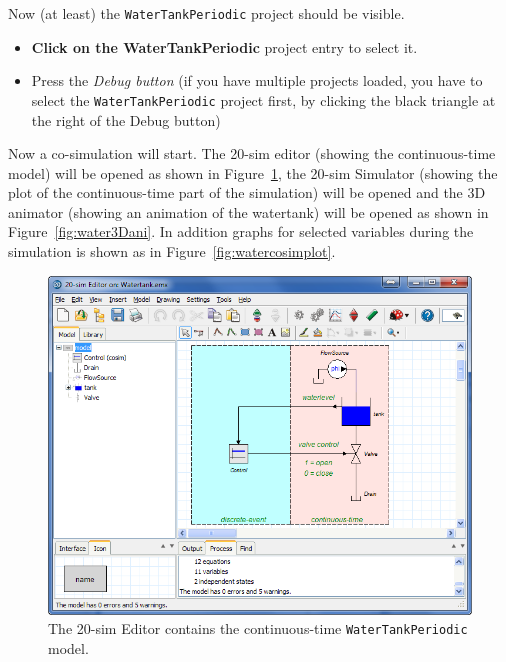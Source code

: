 \documentclass{crescendorepchap}
\begin{document}
Now (at least) the \texttt{WaterTankPeriodic} project should be visible.

\begin{itemize}
\item
  \textbf{Click on the WaterTankPeriodic} project entry to select it.
\item
  Press the \emph{Debug button}
  (if you have multiple
  projects loaded, you have to select the \texttt{WaterTankPeriodic} project first, by
  clicking the black triangle at the right of the Debug button)
\end{itemize}

Now a co-simulation will start. The 20-sim editor (showing the
continuous-time model) will be opened as shown in
Figure~\ref{fig:watertankeditor}, the 20-sim Simulator (showing the
plot of the continuous-time part of the simulation) will be opened and
the 3D animator (showing an animation of the watertank) will be opened
as shown in Figure~\ref{fig:water3Dani}. In addition graphs for
selected variables during the simulation is shown as in
Figure~\ref{fig:watercosimplot}.

\begin{figure}[htbp]
\centering
\includegraphics[width=.9\textwidth]{images/20simEditorWaterTank.png}
\caption{The 20-sim Editor contains the continuous-time \texttt{WaterTankPeriodic} model.\label{fig:watertankeditor}}
\end{figure}
\end{document}
